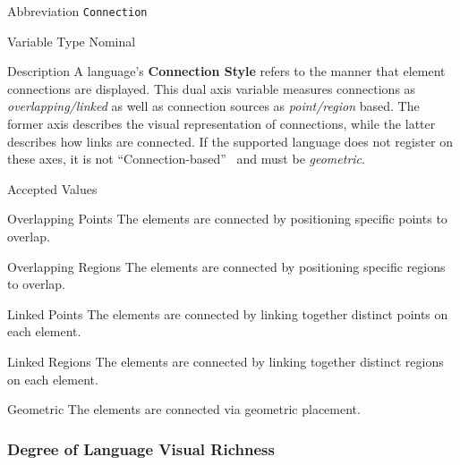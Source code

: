 \begin{AlignedDesc}
  \item[Abbreviation] \texttt{Connection}

  \item[Variable Type] Nominal

  \item[Description] A language's \textbf{Connection Style} refers to the
  manner that element connections are displayed. This dual axis variable
  measures connections as \textit{overlapping/linked} as well as
  connection sources as \textit{point/region} based. The former axis
  describes the visual representation of connections, while the latter
  describes how links are connected. If the supported language does not
  register on these axes, it is not ``Connection-based''~\cite{costagliola2002}
  and must be \textit{geometric}.

  \item[Accepted Values]

  \begin{AlignedDesc}
    \item[Overlapping Points] The elements are connected by positioning
    specific points to overlap.~\cite{costagliola2002}
    \item[Overlapping Regions] The elements are connected by positioning
    specific regions to overlap.~\cite{costagliola2002}
    \item[Linked Points] The elements are connected by linking together
    distinct points on each element.~\cite{costagliola2002}
    \item[Linked Regions] The elements are connected by linking together
    distinct regions on each element.~\cite{costagliola2002}
    \item[Geometric] The elements are connected via geometric placement.~\cite{costagliola2002}
  \end{AlignedDesc}

\end{AlignedDesc}

\subsubsection{Degree of Language Visual Richness}
\label{subsubsec:languagerichness}

